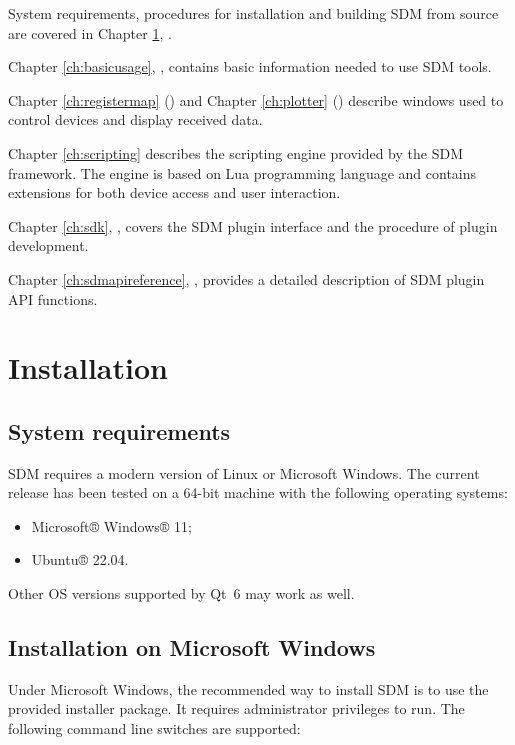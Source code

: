 \documentclass[a4paper,12pt,twoside,extrafontsizes]{memoir}
\begin{document}
System requirements, procedures for installation and building SDM from source are covered in Chapter \ref{ch:installation}, .

Chapter \ref{ch:basicusage}, , contains basic information needed to use SDM tools.

Chapter \ref{ch:registermap} () and Chapter \ref{ch:plotter} () describe  windows used to control devices and display received data.

Chapter \ref{ch:scripting} describes the scripting engine provided by the SDM framework. The engine is based on Lua programming language and contains extensions for both device access and user interaction.

Chapter \ref{ch:sdk}, , covers the SDM plugin interface and the procedure of plugin development.

Chapter \ref{ch:sdmapireference}, , provides a detailed description of SDM plugin API functions.

\chapter{Installation}
\label{ch:installation}

\section{System requirements}

SDM requires a modern version of Linux or Microsoft Windows. The current release has been tested on a 64-bit machine with the following operating systems:

\begin{itemize}
	\item Microsoft® Windows® 11;
	\item Ubuntu® 22.04.
\end{itemize}

Other OS versions supported by Qt\ 6 may work as well.

\section{Installation on Microsoft Windows}

Under Microsoft Windows, the recommended way to install SDM is to use the provided installer package. It requires administrator privileges to run. The following command line switches are supported:
\end{document}
